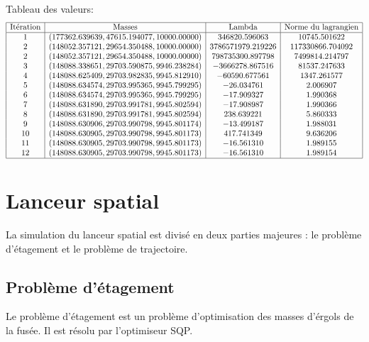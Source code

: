 \documentclass[a4paper,20pt]{article}
\begin{document}
Tableau des valeurs:
$$
\begin{array}{|c|c|c|c|}
\hline
\text{It\'eration} & \text{Masses} & \text{Lambda} & \text{Norme du lagrangien} \\
\hline
1 & (177362.639639, 47615.194077, 10000.00000) & 346820.596063 & 10745.501622 \\
2 & (148052.357121, 29654.350488, 10000.00000) & 3786571979.219226 & 117330866.704092 \\
2 & (148052.357121, 29654.350488, 10000.00000) & 798735300.897798 & 7499814.214797 \\
3 & (148088.338651, 29703.590875, 9946.238284) &-3666278.867516 & 81537.247633 \\
4 & (148088.625409, 29703.982835, 9945.812910) &-60590.677561 & 1347.261577 \\
5 & (148088.634574, 29703.995365, 9945.799295) &-26.034761 & 2.006907 \\
6 & (148088.634574, 29703.995365, 9945.799295) &-17.909327 & 1.990368 \\
7 & (148088.631890, 29703.991781, 9945.802594) &-17.908987 & 1.990366 \\
8 & (148088.631890, 29703.991781, 9945.802594) &238.639221 & 5.860333 \\
9 & (148088.630906, 29703.990798, 9945.801174) &-13.499187 & 1.988031 \\
10 & (148088.630905, 29703.990798, 9945.801173) &417.741349 & 9.636206 \\
11 & (148088.630905, 29703.990798, 9945.801173) &-16.561310 & 1.989155 \\
12 & (148088.630905, 29703.990798, 9945.801173) &-16.561310 & 1.989154 \\
\hline
\end{array}
$$

\section{Lanceur spatial}
La simulation du lanceur spatial est divis\'e en deux parties majeures : le
 probl\`eme d'\'etagement et le probl\`eme de trajectoire.

\subsection{Probl\`eme d'\'etagement}
Le probl\`eme d'\'etagement est un probl\`eme d'optimisation des masses
 d'\'ergols de la fus\'ee. Il est r\'esolu par l'optimiseur SQP.
\end{document}
